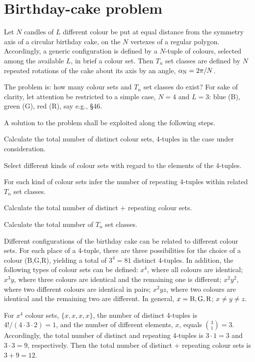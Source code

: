 \documentclass[12pt,a4paper]{article}
\begin{document}
\section{Birthday-cake problem}
\label{a:bica}

Let $N$ candles of $L$ different colour be put at equal distance from the
symmetry axis of a circular birthday cake, on the $N$ vertexes of a regular
polygon.
Accordingly, a generic configuration is defined by a $N$-tuple of colours,
selected among the available $L$, in brief a colour set.   Then $T_n$ set
classes are defined by $N$ repeated rotations of the cake about its axis by an
angle, $\alpha_{\rm N}=2\pi/N$.

The problem is: how many colour sets and
$T_n$ set classes do exist?   For sake of clarity, let attention
be restricted to a simple case, $N=4$ and $L=3$: blue (B), green (G), red (R),
say e.g., \cite{Hoo07} \S46.

A solution to the problem shall be exploited along the following steps.
\begin{trivlist}%
\item[\hspace\labelsep{\bf (i)}]
Calculate the total number of distinct colour sets, 4-tuples in the case under
consideration.
\item[\hspace\labelsep{\bf (ii)}]
Select different kinds of colour sets with regard to the elements of the 
4-tuples.
\item[\hspace\labelsep{\bf (iii)}]
For each kind of colour sets infer the number of repeating 4-tuples within
related $T_n$  set classes.
\item[\hspace\labelsep{\bf (iv)}]
Calculate the total number of distinct + repeating colour sets.
\item[\hspace\labelsep{\bf (v)}]
Calculate the total number of $T_n$ set classes.
\end{trivlist}%
%

Different configurations of the birthday cake can be related to different
colour sets.   For each place of a 4-tuple, there are three possibilities for
the choice of a colour (B,G,R), yielding a total of $3^4=81$ distinct
4-tuples.   In addition, the following types of colour sets can be defined:
$x^4$, where all colours are identical; $x^3y$, where three colours are
identical and the remaining one is different; $x^2y^2$, where two different
colours
are identical in pairs; $x^2yz$, where two colours are identical and the
remaining two are different.   In general, $x={\rm B,G,R}$; $x\ne y\ne z$.

For $x^4$ colour sets, $\{x,x,x,x\}$, the number of distinct 4-tuples is 
$4!/(4\cdot3\cdot2)=1$, and the number of different elements, $x$, equals
${3\choose1}=3$.   Accordingly, the total number of distinct and repeating
4-tuples is $3\cdot1=3$ and $3\cdot3=9$, respectively.   Then the total number
of distinct + repeating colour sets is $3+9 = 12$.
\end{document}

